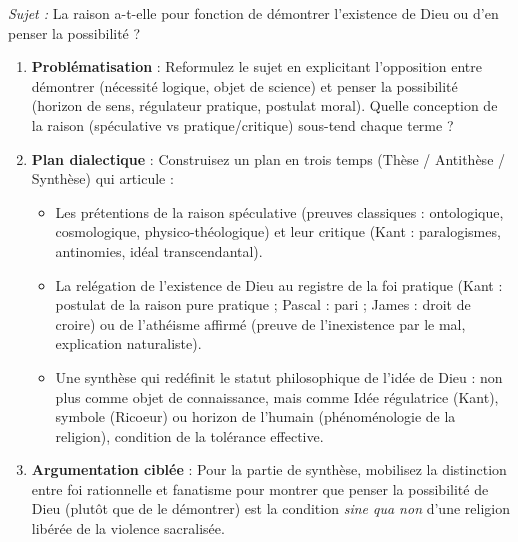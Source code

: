 \documentclass[11pt]{article}
\begin{document}
\begin{exercice}
\textit{Sujet :} \og La raison a-t-elle pour fonction de démontrer l'existence de Dieu ou d'en penser la possibilité ? \fg{}
\begin{enumerate}
    \item \textbf{Problématisation} : Reformulez le sujet en explicitant l'opposition entre \og démontrer \fg{} (nécessité logique, objet de science) et \og penser la possibilité \fg{} (horizon de sens, régulateur pratique, postulat moral). Quelle conception de la raison (spéculative vs pratique/critique) sous-tend chaque terme ?
    \item \textbf{Plan dialectique} : Construisez un plan en trois temps (Thèse / Antithèse / Synthèse) qui articule :
    \begin{itemize}
        \item Les prétentions de la raison spéculative (preuves classiques : ontologique, cosmologique, physico-théologique) et leur critique (Kant : paralogismes, antinomies, idéal transcendantal).
        \item La relégation de l'existence de Dieu au registre de la foi pratique (Kant : postulat de la raison pure pratique ; Pascal : pari ; James : droit de croire) ou de l'athéisme affirmé (preuve de l'inexistence par le mal, explication naturaliste).
        \item Une synthèse qui redéfinit le statut philosophique de l'idée de Dieu : non plus comme objet de connaissance, mais comme \og Idée régulatrice \fg{} (Kant), \og symbole \fg{} (Ricoeur) ou \og horizon de l'humain \fg{} (phénoménologie de la religion), condition de la tolérance effective.
    \end{itemize}
    \item \textbf{Argumentation ciblée} : Pour la partie de synthèse, mobilisez la distinction entre \og foi rationnelle \fg{} et \og fanatisme \fg{} pour montrer que \og penser la possibilité \fg{} de Dieu (plutôt que de le démontrer) est la condition \textit{sine qua non} d'une religion libérée de la violence sacralisée.
\end{enumerate}
\end{exercice}
\end{document}
